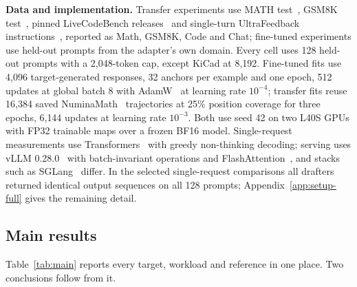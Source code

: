 \textbf{Data and implementation.} Transfer experiments use MATH test~\citep{hendrycks2021math}, GSM8K test~\citep{cobbe2021gsm8k}, pinned LiveCodeBench releases~\citep{jain2024livecodebench} and single-turn UltraFeedback instructions~\citep{cui2024ultrafeedback}, reported as Math, GSM8K, Code and Chat; fine-tuned experiments use held-out prompts from the adapter's own domain. Every cell uses 128 held-out prompts with a 2{,}048-token cap, except KiCad at 8{,}192. Fine-tuned fits use 4{,}096 target-generated responses, 32 anchors per example and one epoch, 512 updates at global batch 8 with AdamW~\citep{loshchilov2019adamw} at learning rate $10^{-4}$; transfer fits reuse 16{,}384 saved NuminaMath~\citep{li2024numinamath} trajectories at 25\% position coverage for three epochs, 6{,}144 updates at learning rate $10^{-3}$. Both use seed 42 on two L40S GPUs with FP32 trainable maps over a frozen BF16 model. Single-request measurements use Transformers~\citep{wolf2020transformers} with greedy non-thinking decoding; serving uses vLLM 0.28.0~\citep{kwon2023vllm} with batch-invariant operations and FlashAttention~\citep{dao2023flashattention2}, and stacks such as SGLang~\citep{zheng2024sglang} differ. In the selected single-request comparisons all drafters returned identical output sequences on all 128 prompts; Appendix~\ref{app:setup-full} gives the remaining detail.

\subsection{Main results}
\label{sec:main-results}
Table~\ref{tab:main} reports every target, workload and reference in one place. Two conclusions follow from it.

